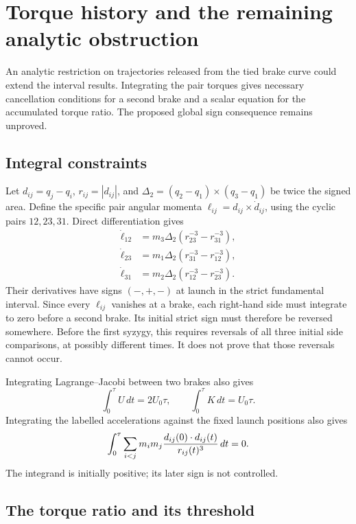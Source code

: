 \section{Torque history and the remaining analytic obstruction}\label{sec:torque}

An analytic restriction on trajectories released from the tied brake curve
could extend the interval results. Integrating the pair torques gives
necessary cancellation conditions for a second brake and a scalar equation
for the accumulated torque ratio. The proposed global sign consequence
remains unproved.

\subsection{Integral constraints}

Let $d_{ij}=q_j-q_i$, $r_{ij}=|d_{ij}|$, and
$\Delta_2=(q_2-q_1)\times(q_3-q_1)$ be twice the signed area. Define the
specific pair angular momenta $\ell_{ij}=d_{ij}\times\dot d_{ij}$, using
the cyclic pairs $12,23,31$. Direct differentiation gives
\begin{equation}\label{eq:torques}
\begin{aligned}
 \dot\ell_{12}&=m_3\Delta_2(r_{23}^{-3}-r_{31}^{-3}),\\
 \dot\ell_{23}&=m_1\Delta_2(r_{31}^{-3}-r_{12}^{-3}),\\
 \dot\ell_{31}&=m_2\Delta_2(r_{12}^{-3}-r_{23}^{-3}).
\end{aligned}
\end{equation}
Their derivatives have signs $(-,+,-)$ at launch in the strict fundamental
interval. Since every $\ell_{ij}$ vanishes at a brake, each right-hand
side must integrate to zero before a second brake. Its initial strict
sign must therefore be reversed somewhere. Before the first syzygy, this
requires reversals of all three initial side comparisons, at possibly
different times. It does not prove that those reversals cannot occur.

Integrating Lagrange--Jacobi between two brakes also gives
\[
 \int_0^\tau U\,dt=2U_0\tau,\qquad
 \int_0^\tau K\,dt=U_0\tau.
\]
Integrating the labelled accelerations against the fixed launch positions
also gives
\[
 \int_0^\tau\sum_{i<j}m_im_j
 {d_{ij}(0)\cdot d_{ij}(t)\over r_{ij}(t)^3}\,dt=0.
\]
The integrand is initially positive; its later sign is not controlled.

\subsection{The torque ratio and its threshold}

